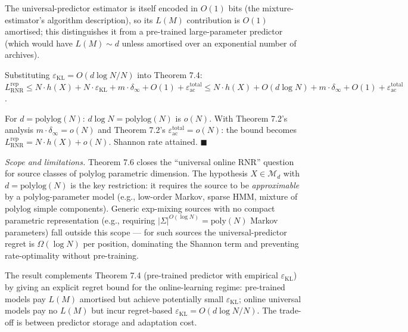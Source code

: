 \documentclass[
]{article}
\begin{document}
The universal-predictor estimator is itself encoded in $O(1)$ bits
(the mixture-estimator's algorithm description), so its $L(M)$
contribution is $O(1)$ amortised; this distinguishes it from a
pre-trained large-parameter predictor (which would have $L(M)
\sim d$ unless amortised over an exponential number of archives).

Substituting $\varepsilon_{\mathrm{KL}} = O(d \log N / N)$ into
Theorem 7.4:
$L^{\mathrm{rep}}_{\mathrm{RNR}} \leq N \cdot h(X) +
N \cdot \varepsilon_{\mathrm{KL}} + m \cdot \delta_\infty + O(1) +
\varepsilon_{\mathrm{ac}}^{\mathrm{total}}
\leq N \cdot h(X) + O(d \log N) + m \cdot \delta_\infty + O(1) +
\varepsilon_{\mathrm{ac}}^{\mathrm{total}}$.

For $d = \mathrm{polylog}(N)$: $d \log N = \mathrm{polylog}(N)$ is
$o(N)$. With Theorem 7.2's analysis $m \cdot \delta_\infty = o(N)$
and Theorem 7.2's $\varepsilon_{\mathrm{ac}}^{\mathrm{total}} = o(N)$:
the bound becomes $L^{\mathrm{rep}}_{\mathrm{RNR}} = N \cdot h(X) +
o(N)$. Shannon rate attained.
\hfill$\blacksquare$

\emph{Scope and limitations.} Theorem 7.6 closes the
``universal online RNR'' question for source classes of polylog
parametric dimension. The hypothesis $X \in \mathcal{M}_d$ with
$d = \mathrm{polylog}(N)$ is the key restriction: it requires the
source to be \emph{approximable} by a polylog-parameter model
(e.g., low-order Markov, sparse HMM, mixture of $\mathrm{polylog}$
simple components). Generic exp-mixing sources with no compact
parametric representation (e.g., requiring $|\Sigma|^{O(\log N)} =
\mathrm{poly}(N)$ Markov parameters) fall outside this scope --- for
such sources the universal-predictor regret is $\Omega(\log N)$
per position, dominating the Shannon term and preventing
rate-optimality without pre-training.

The result complements Theorem 7.4 (pre-trained predictor with
empirical $\varepsilon_{\mathrm{KL}}$) by giving an explicit regret
bound for the online-learning regime: pre-trained models pay $L(M)$
amortised but achieve potentially small $\varepsilon_{\mathrm{KL}}$;
online universal models pay no $L(M)$ but incur regret-based
$\varepsilon_{\mathrm{KL}} = O(d \log N / N)$. The trade-off is
between predictor storage and adaptation cost.
\end{document}

